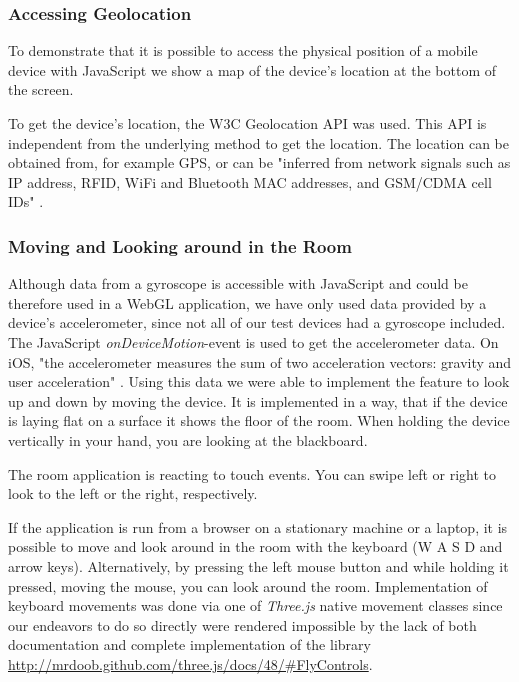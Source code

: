 \documentclass[12pt,journal,compsoc]{IEEEtran}
\begin{document}
\subsubsection{Accessing Geolocation}
To demonstrate that it is possible to access the physical position of a mobile device with JavaScript we show a map of the device’s location at the bottom of the screen. 

To get the device’s location, the W3C Geolocation API \cite{locationAPI} was used. This API is independent from the underlying method to get the location. The location can be obtained from, for example GPS, or can be "inferred from network signals such as IP address, RFID, WiFi and Bluetooth MAC addresses, and GSM/CDMA cell IDs" \cite{locationAPI}. 

\subsubsection{Moving and Looking around in the Room}
Although data from a gyroscope is accessible with JavaScript and could be therefore used in a WebGL application, we have only used data provided by a device’s accelerometer, since not all of our test devices had a gyroscope included. The JavaScript \textit{onDeviceMotion}-event is used to get the accelerometer data. On iOS, "the accelerometer measures the sum of two acceleration vectors: gravity and user acceleration" \cite{CMDeviceMotion}. Using this data we were able to implement the feature to look up and down by moving the device. It is implemented in a way, that if the device is laying flat on a surface it shows the floor of the room. When holding the device vertically in your hand, you are looking at the blackboard.

The room application is reacting to touch events. You can swipe left or right to look to the left or the right, respectively.

If the application is run from a browser on a stationary machine or a laptop, it is possible to  move and look around in the room with the keyboard (W A S D and arrow keys). Alternatively, by pressing the left mouse button and while holding it pressed, moving the mouse, you can look around the room. Implementation of keyboard movements was done via one of \textit{Three.js} native movement classes since our endeavors to do so directly were rendered impossible by the lack of both documentation and complete implementation of the library \url{http://mrdoob.github.com/three.js/docs/48/#FlyControls}.
\end{document}
